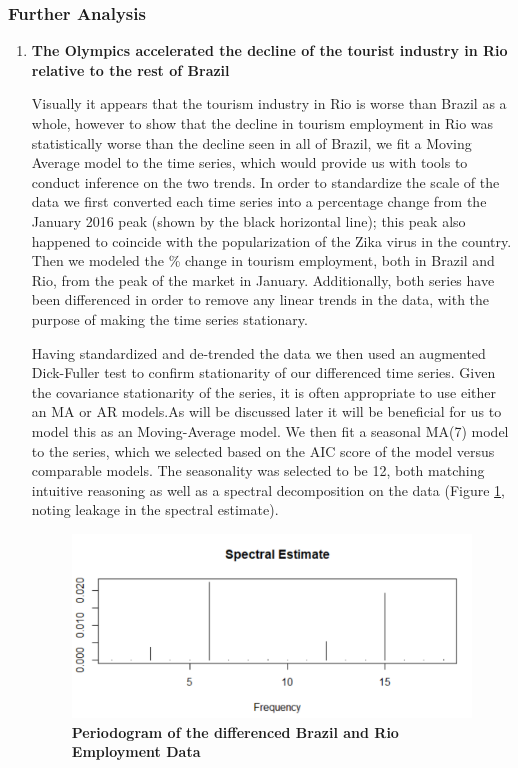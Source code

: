 \documentclass[11pt, twocolumn]{article}
\begin{document}
    \subsubsection{Further Analysis}
\begin{enumerate}
     \item \textbf{The Olympics accelerated the decline of the tourist industry in Rio relative to the rest of Brazil}
     
     
    Visually it appears that the tourism industry in Rio is worse than Brazil as a whole, however to show that the decline in tourism employment in Rio was statistically worse than the decline seen in all of Brazil, we fit a Moving Average model to the time series, which would provide us with tools to conduct inference on the two trends. In order to standardize the scale of the data we first converted each time series into a percentage change from the January 2016 peak (shown by the black horizontal line); this peak also happened to coincide with the popularization of the Zika virus in the country. Then we modeled the \% change in tourism employment, both in Brazil and Rio, from the peak of the market in January. Additionally, both series have been differenced in order to remove any linear trends in the data, with the purpose of making the time series stationary. 
    
    Having standardized and de-trended the data we then used an augmented Dick-Fuller test to confirm stationarity of our differenced time series. Given the covariance stationarity of the series, it is often appropriate to use either an  MA or AR models.As will be discussed later it will be beneficial for us to model this as an Moving-Average model. We then fit a seasonal MA(7) model to the series, which we selected based on the AIC score of the model versus comparable models.  The seasonality was selected to be 12, both matching intuitive reasoning as well as a spectral decomposition on the data (Figure \ref{fig:Spectral_Plot}, noting leakage in the spectral estimate).
  
   \begin{figure}[H]
        \centering
            \includegraphics[scale=0.5]{Spectral_estimate.PNG}
        \caption{\textbf{Periodogram of the differenced Brazil and Rio Employment Data}}
        \label{fig:Spectral_Plot}
    \end{figure}  
    

\end{enumerate}
\end{document}
